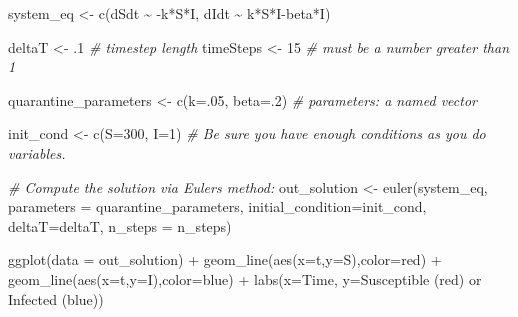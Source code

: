 \documentclass[
]{book}
\newenvironment{Shaded}{\begin{snugshade}}{\end{snugshade}}
\newcommand{\AttributeTok}[1]{\textcolor[rgb]{0.77,0.63,0.00}{#1}}
\newcommand{\CommentTok}[1]{\textcolor[rgb]{0.56,0.35,0.01}{\textit{#1}}}
\newcommand{\DecValTok}[1]{\textcolor[rgb]{0.00,0.00,0.81}{#1}}
\newcommand{\FunctionTok}[1]{\textcolor[rgb]{0.00,0.00,0.00}{#1}}
\newcommand{\NormalTok}[1]{#1}
\newcommand{\OtherTok}[1]{\textcolor[rgb]{0.56,0.35,0.01}{#1}}
\newcommand{\SpecialCharTok}[1]{\textcolor[rgb]{0.00,0.00,0.00}{#1}}
\newcommand{\StringTok}[1]{\textcolor[rgb]{0.31,0.60,0.02}{#1}}
\theoremstyle{definition}
\theoremstyle{definition}
\theoremstyle{definition}
\theoremstyle{remark}
\begin{document}
\begin{Shaded}
\begin{Highlighting}[]
\NormalTok{system\_eq }\OtherTok{\textless{}{-}} \FunctionTok{c}\NormalTok{(dSdt }\SpecialCharTok{\textasciitilde{}} \SpecialCharTok{{-}}\NormalTok{k}\SpecialCharTok{*}\NormalTok{S}\SpecialCharTok{*}\NormalTok{I,}
\NormalTok{               dIdt }\SpecialCharTok{\textasciitilde{}}\NormalTok{ k}\SpecialCharTok{*}\NormalTok{S}\SpecialCharTok{*}\NormalTok{I}\SpecialCharTok{{-}}\NormalTok{beta}\SpecialCharTok{*}\NormalTok{I)}


\NormalTok{deltaT }\OtherTok{\textless{}{-}}\NormalTok{ .}\DecValTok{1}    \CommentTok{\# timestep length}
\NormalTok{timeSteps }\OtherTok{\textless{}{-}} \DecValTok{15}   \CommentTok{\# must be a number greater than 1}

\NormalTok{quarantine\_parameters }\OtherTok{\textless{}{-}} \FunctionTok{c}\NormalTok{(}\AttributeTok{k=}\NormalTok{.}\DecValTok{05}\NormalTok{, }\AttributeTok{beta=}\NormalTok{.}\DecValTok{2}\NormalTok{)   }\CommentTok{\# parameters: a named vector}

\NormalTok{init\_cond }\OtherTok{\textless{}{-}} \FunctionTok{c}\NormalTok{(}\AttributeTok{S=}\DecValTok{300}\NormalTok{, }\AttributeTok{I=}\DecValTok{1}\NormalTok{)  }\CommentTok{\# Be sure you have enough conditions as you do variables.}

\CommentTok{\# Compute the solution via Euler\textquotesingle{}s method:}
\NormalTok{out\_solution }\OtherTok{\textless{}{-}} \FunctionTok{euler}\NormalTok{(system\_eq,}
                      \AttributeTok{parameters =}\NormalTok{ quarantine\_parameters,}
                      \AttributeTok{initial\_condition=}\NormalTok{init\_cond,}
                      \AttributeTok{deltaT=}\NormalTok{deltaT,}
                      \AttributeTok{n\_steps =}\NormalTok{ n\_steps)}


\FunctionTok{ggplot}\NormalTok{(}\AttributeTok{data =}\NormalTok{ out\_solution) }\SpecialCharTok{+}
  \FunctionTok{geom\_line}\NormalTok{(}\FunctionTok{aes}\NormalTok{(}\AttributeTok{x=}\NormalTok{t,}\AttributeTok{y=}\NormalTok{S),}\AttributeTok{color=}\StringTok{\textquotesingle{}red\textquotesingle{}}\NormalTok{) }\SpecialCharTok{+}
  \FunctionTok{geom\_line}\NormalTok{(}\FunctionTok{aes}\NormalTok{(}\AttributeTok{x=}\NormalTok{t,}\AttributeTok{y=}\NormalTok{I),}\AttributeTok{color=}\StringTok{\textquotesingle{}blue\textquotesingle{}}\NormalTok{) }\SpecialCharTok{+}
  \FunctionTok{labs}\NormalTok{(}\AttributeTok{x=}\StringTok{\textquotesingle{}Time\textquotesingle{}}\NormalTok{,}
       \AttributeTok{y=}\StringTok{\textquotesingle{}Susceptible (red) or Infected (blue)\textquotesingle{}}\NormalTok{)}
\end{Highlighting}
\end{Shaded}
\end{document}
